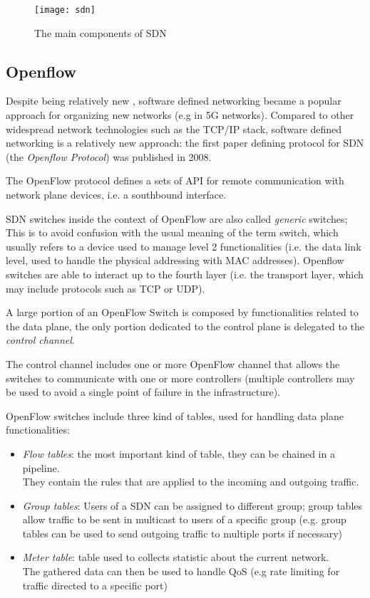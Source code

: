 \begin{figure}[h!]
	\texttt{[image: sdn]}
	\caption{The main components of SDN}	
	\centering
\end{figure}



\subsection{Openflow}
Despite being relatively new \cite{openflow} , software defined networking became a popular approach for organizing new networks (e.g in 5G networks).
Compared to other widespread network technologies such as the TCP/IP stack, software defined networking is a relatively new approach: the first paper defining protocol for SDN (the \textit{Openflow Protocol}) was published in 2008.

The OpenFlow protocol defines a sets of API for remote communication with network plane devices, i.e. a southbound interface.


SDN switches inside the context of OpenFlow are also called \textit{generic} switches;
This is to avoid confusion with the usual meaning of the term switch, which usually refers to a device used to manage level 2 functionalities (i.e. the data link level, used to handle the physical addressing with MAC addresses). 
Openflow switches are able to interact up to the fourth layer (i.e. the transport layer, which may include protocols such as TCP or UDP).

A large portion of an OpenFlow Switch is composed by functionalities related to the data plane, the only portion dedicated to the control plane is delegated to the \textit{control channel}.

The control channel includes one or more OpenFlow channel that allows the switches to communicate with one or more controllers (multiple controllers may be used to avoid a single point of failure in the infrastructure).
 
OpenFlow switches include three kind of tables, used for handling data plane functionalities:

\begin{itemize}
	\item \textit{Flow tables}: the most important kind of table, they can be chained in a pipeline. \\
	They contain the rules that are applied to the incoming and outgoing traffic.
	\item \textit{Group tables}: Users of a SDN can be assigned to different group; group tables allow traffic to be sent in multicast to users of a specific group (e.g. group tables can be used to send outgoing traffic to multiple ports if necessary)
	\item \textit{Meter table}: table used to collects statistic about the current network. \\
	The gathered data can then be used to handle QoS (e.g rate limiting for traffic directed to a specific port)
\end{itemize}

